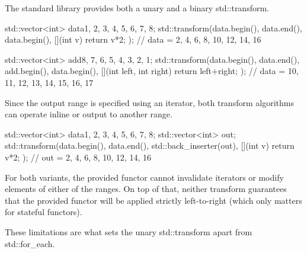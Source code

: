 


The standard library provides both a unary and a binary std::transform.

\begin{box-note}
\begin{cppcode}
std::vector<int> data{1, 2, 3, 4, 5, 6, 7, 8};
std::transform(data.begin(), data.end(),
               data.begin(), [](int v) { return v*2; });
// data = {2, 4, 6, 8, 10, 12, 14, 16}

std::vector<int> add{8, 7, 6, 5, 4, 3, 2, 1};
std::transform(data.begin(), data.end(), add.begin(),
               data.begin(), [](int left, int right) {
                  return left+right; });
// data = {10, 11, 12, 13, 14, 15, 16, 17}
\end{cppcode}
\end{box-note}

Since the output range is specified using an iterator, both transform algorithms can operate inline or output to another range.

\begin{box-note}
\begin{cppcode}
std::vector<int> data{1, 2, 3, 4, 5, 6, 7, 8};
std::vector<int> out;
std::transform(data.begin(), data.end(),
    std::back_inserter(out), [](int v) { return v*2; });
// out = {2, 4, 6, 8, 10, 12, 14, 16}
\end{cppcode}
\end{box-note}

For both variants, the provided functor cannot invalidate iterators or modify elements of either of the ranges. On top of that, neither transform guarantees that the provided functor will be applied strictly left-to-right (which only matters for stateful functors).

These limitations are what sets the unary std::transform apart from std::for\_each.

